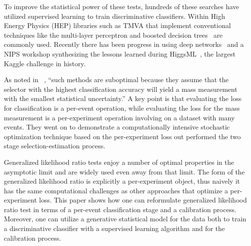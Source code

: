 \documentclass[11pt, oneside]{article}   	%
\begin{document}
To improve the statistical power of these tests, hundreds of these searches have utilized supervised learning to train discriminative classifiers. Within High Energy Physics (HEP) libraries such as TMVA that implement conventional techniques like the multi-layer perceptron and boosted decision trees~\citep{Hocker:2007ht} are commonly used. Recently there has been progress in using deep networks~\citep{Baldi:2014kfa} and a NIPS workshop synthesizing the lessons learned during HiggsML~\citep{HepML}, the largest Kaggle challenge in history. 

As noted in ~\citep{Whiteson:2006ws}, ``such methods are suboptimal because they assume that the selector with the highest classification accuracy will yield a mass measurement with the smallest statistical uncertainty.''
A key point is that evaluating the loss for classification is a per-event operation, while evaluating the loss for the mass measurement is a per-experiment operation involving on a dataset with many events. They went on to demonstrate a computationally intensive stochastic optimization technique based on the per-experiment loss out performed the two stage selection-estimation process. 

Generalized likelihood ratio tests enjoy a number of optimal properties in the asymptotic limit and are widely used even away from that limit. The form of the generalized likelihood ratio is explicitly a per-experiment object, thus naively it has the same computational challenges as other approaches that optimize a per-experiment loss. This paper shows how one can reformulate generalized likelihood ratio test in terms of a per-event classification stage and a calibration process. Moreover, one can utilize a generative statistical model for the data both to train a discriminative classifier with a supervised learning algorithm and for the calibration process.

%
\end{document}
